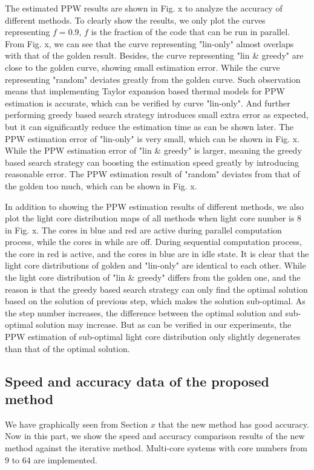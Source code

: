 The estimated PPW results are shown in Fig. x to analyze the accuracy of different methods. To clearly show the results, we only plot the curves representing $f = 0.9$, $f$ is the fraction of the code that can be run in parallel. From Fig. x, we can see that the curve representing "lin-only" almost overlaps with that of the golden result. Besides, the curve representing "lin \& greedy" are close to the golden curve, showing small estimation error. While the curve representing "random" deviates greatly from the golden curve. Such observation means that implementing Taylor expansion based thermal models for PPW estimation is accurate, which can be verified by curve "lin-only". And further performing greedy based search strategy introduces small extra error as expected, but it can significantly reduce the estimation time as can be shown later. The PPW estimation error of "lin-only" is very small, which can be shown in Fig. x. While the PPW estimation error of "lin \& greedy" is larger, meaning the greedy based search strategy can boosting the estimation speed greatly by introducing reasonable error. The PPW estimation result of "random" deviates from that of the golden too much, which can be shown in Fig. x.

In addition to showing the PPW estimation results of different methods, we also plot the light core distribution maps of all methods when light core number is $8$ in Fig. x. The cores in blue and red are active during parallel computation process, while the cores in while are off. During sequential computation process, the core in red is active, and the cores in blue are in idle state. It is clear that the light core distributions of golden and "lin-only" are identical to each other. While the light core distribution of "lin \& greedy" differs from the golden one, and the reason is that the greedy based search strategy can only find the optimal solution based on the solution of previous step, which makes the solution sub-optimal. As the step number increases, the difference between the optimal solution and sub-optimal solution may increase. But as can be verified in our experiments, the PPW estimation of sub-optimal light core distribution only slightly degenerates than that of the optimal solution. 


\subsection{Speed and accuracy data of the proposed method}
We have graphically seen from Section $x$ that the new method has good accuracy. Now in this part, we show the speed and accuracy comparison results of the new method against the iterative method. Multi-core systems with core numbers from $9$ to $64$ are implemented.

